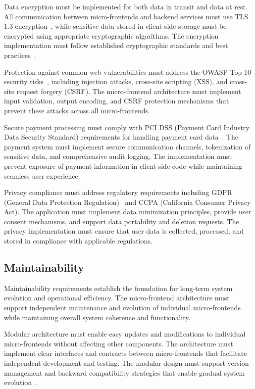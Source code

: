 \documentclass[12pt,a4paper]{report}
\begin{document}
Data encryption must be implemented for both data in transit and data at rest. All communication between micro-frontends and backend services must use TLS 1.3 encryption~\cite{rfc8446}, while sensitive data stored in client-side storage must be encrypted using appropriate cryptographic algorithms. The encryption implementation must follow established cryptographic standards and best practices~\cite{nist2018cryptographic}.

Protection against common web vulnerabilities must address the OWASP Top 10 security risks~\cite{owasp2021top10}, including injection attacks, cross-site scripting (XSS), and cross-site request forgery (CSRF). The micro-frontend architecture must implement input validation, output encoding, and CSRF protection mechanisms that prevent these attacks across all micro-frontends.

Secure payment processing must comply with PCI DSS (Payment Card Industry Data Security Standard) requirements for handling payment card data~\cite{pcidss2020}. The payment system must implement secure communication channels, tokenization of sensitive data, and comprehensive audit logging. The implementation must prevent exposure of payment information in client-side code while maintaining seamless user experience.

Privacy compliance must address regulatory requirements including GDPR (General Data Protection Regulation)~\cite{eu2016gdpr} and CCPA (California Consumer Privacy Act). The application must implement data minimization principles, provide user consent mechanisms, and support data portability and deletion requests. The privacy implementation must ensure that user data is collected, processed, and stored in compliance with applicable regulations.

\subsection{Maintainability}

Maintainability requirements establish the foundation for long-term system evolution and operational efficiency. The micro-frontend architecture must support independent maintenance and evolution of individual micro-frontends while maintaining overall system coherence and functionality.

Modular architecture must enable easy updates and modifications to individual micro-frontends without affecting other components. The architecture must implement clear interfaces and contracts between micro-frontends that facilitate independent development and testing. The modular design must support version management and backward compatibility strategies that enable gradual system evolution~\cite{clements2010documenting}.
\end{document}
